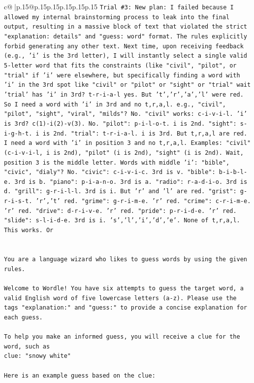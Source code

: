\documentclass{article}
\begin{document}
{\begin{supertabular}{c@{$\;$}|p{.15\linewidth}@{}p{.15\linewidth}p{.15\linewidth}p{.15\linewidth}p{.15\linewidth}p{.15\linewidth}}
{{{\texttt{Trial \#3: New plan: I failed because I allowed my internal brainstorming process to leak into the final output, resulting in a massive block of text that violated the strict "explanation: details" and "guess: word" format. The rules explicitly forbid generating any other text. Next time, upon receiving feedback (e.g., 'i' is the 3rd letter), I will instantly select a single valid 5{-}letter word that fits the constraints (like "civil", "pilot", or "trial" if 'i' were elsewhere, but specifically finding a word with 'i' in the 3rd spot like "civil" or "pilot" or "sight" or "trial" wait 'trial' has 'i' in 3rd? t{-}r{-}i{-}a{-}l yes. But 't','r','a','l' were red. So I need a word with 'i' in 3rd and no t,r,a,l. e.g., "civil", "pilot", "sight", "viral", "milds"? No. "civil" works: c{-}i{-}v{-}i{-}l. 'i' is 3rd? c(1){-}i(2){-}v(3). No. "pilot": p{-}i{-}l{-}o{-}t. i is 2nd. "sight": s{-}i{-}g{-}h{-}t. i is 2nd. "trial": t{-}r{-}i{-}a{-}l. i is 3rd. But t,r,a,l are red. I need a word with 'i' in position 3 and no t,r,a,l. Examples: "civil" (c{-}i{-}v{-}i{-}l, i is 2nd), "pilot" (i is 2nd), "sight" (i is 2nd). Wait, position 3 is the middle letter. Words with middle 'i': "bible", "civic", "dialy"? No. "civic": c{-}i{-}v{-}i{-}c. 3rd is v. "bible": b{-}i{-}b{-}l{-}e. 3rd is b. "piano": p{-}i{-}a{-}n{-}o. 3rd is a. "radio": r{-}a{-}d{-}i{-}o. 3rd is d. "grill": g{-}r{-}i{-}l{-}l. 3rd is i. But 'r' and 'l' are red. "grist": g{-}r{-}i{-}s{-}t. 'r','t' red. "grime": g{-}r{-}i{-}m{-}e. 'r' red. "crime": c{-}r{-}i{-}m{-}e. 'r' red. "drive": d{-}r{-}i{-}v{-}e. 'r' red. "pride": p{-}r{-}i{-}d{-}e. 'r' red. "slide": s{-}l{-}i{-}d{-}e. 3rd is i. 's','l','i','d','e'. None of t,r,a,l. This works. Or} \\
\\ 
\\ 
\texttt{You are a language wizard who likes to guess words by using the given rules.} \\
\\ 
\texttt{Welcome to Wordle! You have six attempts to guess the target word, a valid English word of five lowercase letters (a{-}z). Please use the tags "explanation:" and "guess:" to provide a concise explanation for each guess.} \\
\\ 
\texttt{To help you make an informed guess, you will receive a clue for the word, such as} \\
\texttt{clue: "snowy white"} \\
\\ 
\texttt{Here is an example guess based on the clue:} \\
}}}
\end{supertabular}}
\end{document}
